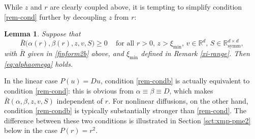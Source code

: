 \documentclass[reqno]{amsart}
\newtheorem{lemma}{Lemma}[section]
\newcommand{\R}{\mathbb{R}}
\newcommand{\be}{\begin{equation}}
\newcommand{\ee}{\end{equation}}
\begin{document}
While $z$ and $r$ are clearly coupled above, it is tempting to simplify condition \eqref{rem-cond} further by decoupling $z$ from $r$: 
%
\begin{lemma}
  Suppose that
  \be\label{rem-condb}
  \bar R\big(\alpha(r),\beta(r),z,v,S\big)\ge0\,\quad \text{for all $r>0$, $z>\xi_{\min}$, $v\in\R^d$, $S\in\R^{d\times d}_{\text{symm}}$},
  \ee
  with $\bar R$ given in \eqref{finform2b} above, and $\xi_{\min}$ defined in Remark {\rm\ref{xi-range}}.
  Then \eqref{eq:alphaomega} holds.
\end{lemma}
%
In the linear case $P(u)=Du$, condition \eqref{rem-condb} is actually equivalent to condition \eqref{rem-cond}: this is obvious from $\alpha\equiv\beta\equiv D$, which makes $\bar R(\alpha,\beta,z,v,S)$ independent of $r$. For nonlinear diffusions, on the other hand, condition \eqref{rem-condb} is typically substantially stronger than \eqref{rem-cond}. The difference between these two conditions is illustrated in Section \ref{sct:xmp-pme2} below in the case $P(r)=r^2$.
\end{document}
